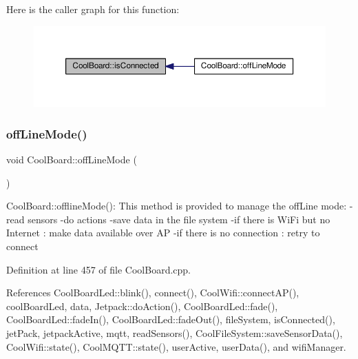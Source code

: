 Here is the caller graph for this function\+:
\nopagebreak
\begin{figure}[H]
\begin{center}
\leavevmode
\includegraphics[width=350pt]{classCoolBoard_ad7442cf4b62c7b0d5bd62a0f75ffc065_icgraph}
\end{center}
\end{figure}
\mbox{\label{classCoolBoard_ae6b5e1274d760462290192acea4adca8}} 
\subsubsection{\texorpdfstring{off\+Line\+Mode()}{offLineMode()}}
{\footnotesize\ttfamily void Cool\+Board\+::off\+Line\+Mode (\begin{DoxyParamCaption}{ }\end{DoxyParamCaption})}

Cool\+Board\+::offline\+Mode()\+: This method is provided to manage the off\+Line mode\+: -\/read sensors -\/do actions -\/save data in the file system -\/if there is Wi\+Fi but no Internet \+: make data available over AP -\/if there is no connection \+: retry to connect 

Definition at line 457 of file Cool\+Board.\+cpp.



References Cool\+Board\+Led\+::blink(), connect(), Cool\+Wifi\+::connect\+A\+P(), cool\+Board\+Led, data, Jetpack\+::do\+Action(), Cool\+Board\+Led\+::fade(), Cool\+Board\+Led\+::fade\+In(), Cool\+Board\+Led\+::fade\+Out(), file\+System, is\+Connected(), jet\+Pack, jetpack\+Active, mqtt, read\+Sensors(), Cool\+File\+System\+::save\+Sensor\+Data(), Cool\+Wifi\+::state(), Cool\+M\+Q\+T\+T\+::state(), user\+Active, user\+Data(), and wifi\+Manager.


